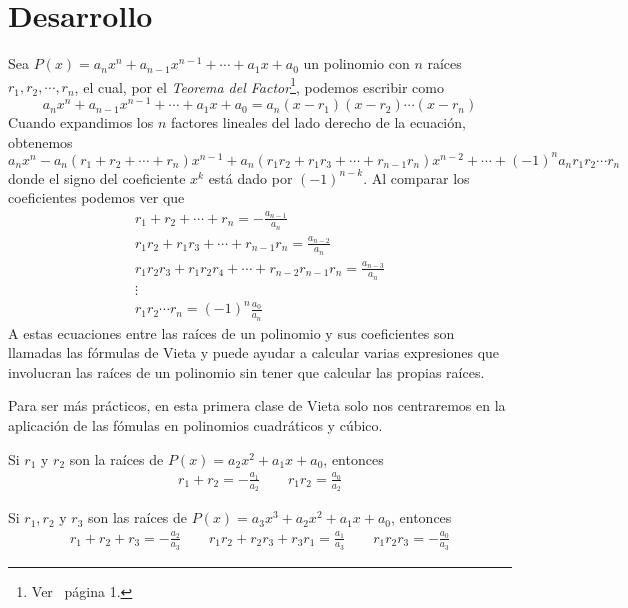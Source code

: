 \section{Desarrollo}
{
    \begin{section-definition}
        Sea $P(x) = a_n x^n + a_{n - 1} x^{n - 1} + \cdots  + a_1 x + a_0$ un polinomio con $n$ raíces $r_1, r_2, \cdots, r_n$,
        el cual, por el \textit{Teorema del Factor}\footnote{Ver~\cite{TD23-clase2} página 1.}, podemos escribir como
        \[a_n x^n + a_{n - 1} x^{n - 1} + \cdots  + a_1 x + a_0 = a_n (x - r_1)(x - r_2) \cdots (x - r_n)\]
        Cuando expandimos los $n$ factores lineales del lado derecho de la ecuación, obtenemos
        \[a_n x^n - a_n(r_1 + r_2 + \cdots + r_n)x^{n - 1} + a_n(r_1 r_2 + r_1 r_3 + \cdots + r_{n - 1} r_n)x^{n - 2} + \cdots + (-1)^n a_n r_1 r_2 \cdots r_n\]
        donde el signo del coeficiente $x^k$ está dado por $(-1)^{n - k}$. Al comparar los coeficientes podemos ver que
        \begin{gather*}
            r_1 + r_2 + \cdots + r_n = - \frac{a_{n - 1}}{a_n}\\
            r_1 r_2 + r_1 r_3 + \cdots + r_{n - 1} r_n = \frac{a_{n - 2}}{a_n}\\
            r_1 r_2 r_3 + r_1 r_2 r_4 + \cdots + r_{n - 2} r_{n - 1} r_n = \frac{a_{n - 3}}{a_n}\\
            \vdots\\
            r_1 r_2 \cdots r_n = (-1)^n \frac{a_0}{a_n}
        \end{gather*}
        A estas ecuaciones entre las raíces de un polinomio y sus coeficientes son llamadas las fórmulas de Vieta y puede
        ayudar a calcular varias expresiones que involucran las raíces de un polinomio sin tener que calcular las propias raíces.
    \end{section-definition}

    Para ser más prácticos, en esta primera clase de Vieta solo nos centraremos en la aplicación de las fómulas en polinomios cuadráticos y cúbico.

    \begin{debox}
        Si $r_1$ y $r_2$ son la raíces de $P(x) = a_2 x^2 + a_1 x + a_0$, entonces
        \begin{gather*}
            r_1 + r_2 = - \frac{a_1}{a_2} \qquad r_1 r_2 = \frac{a_0}{a_2}
        \end{gather*}

        Si $r_1, r_2$ y $r_3$ son las raíces de $P(x) = a_3 x^3 + a_2 x^2 + a_1 x + a_0$, entonces
        \begin{gather*}
            r_1 + r_2 + r_3 = - \frac{a_2}{a_3}\qquad
            r_1 r_2 + r_2 r_3 + r_3 r_1 = \frac{a_1}{a_3}\qquad
            r_1 r_2 r_3 = - \frac{a_0}{a_3}
        \end{gather*}
    \end{debox}

}
